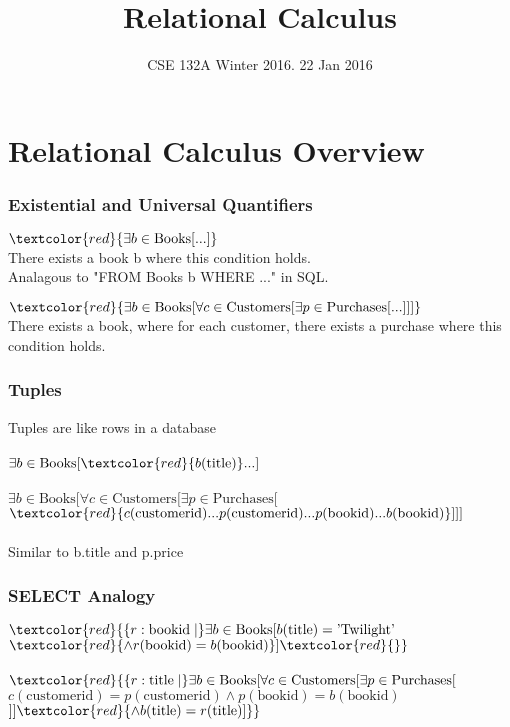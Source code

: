 \documentclass{beamer}
\begin{document}

\title{Relational Calculus}

\date[WI 2016]{CSE 132A Winter 2016. 22 Jan 2016}

\subject{Relational Calculus} %

\begin{frame}
  \titlepage
\end{frame}

\section{Relational Calculus Overview}
\begin{frame}
  \frametitle{Existential and Universal Quantifiers}
  $\textcolor{red}{\exists b \in \text{Books} [...]}$\\
  There exists a book b where this condition holds.\\
  Analagous to "FROM Books b WHERE ..." in SQL.
  
  \hfill 
  
  $\textcolor{red}{\exists b \in \text{Books} [\forall c \in \text{Customers} [ \exists p \in \text{Purchases} [...] ] ]}$\\
  There exists a book, where for each customer, there exists a purchase where this condition holds.\\
  \hfill 
\end{frame}

\begin{frame}
  \frametitle{Tuples}
  Tuples are like rows in a database\\
  \hfill \\
  $\exists b \in \text{Books} [\textcolor{red}{b(\text{title})} ...]$\\
  \hfill \\
  $\exists b \in \text{Books} [\forall c \in \text{Customers} [ \exists p \in \text{Purchases} [ $
  $\textcolor{red}{c(\text{customerid}) ... p(\text{customerid}) ... p(\text{bookid}) ... b(\text{bookid})}] ] ]$\\
  \hfill \\
  Similar to b.title and p.price
\end{frame}

\begin{frame}
  \frametitle{SELECT Analogy}
  $\textcolor{red}{\{r:\text{bookid} \mid }\exists b \in \text{Books} [b(\text{title})
= \text{'Twilight'}$ \\
  $\textcolor{red}{\land r(\text{bookid}) = b(\text{bookid})}]\textcolor{red}{\}}$\\
  \hfill \\
  $\textcolor{red}{\{ r:\text{title} \mid }\exists b \in \text{Books} [\forall c \in
\text{Customers} [ \exists p \in \text{Purchases} [ $\\
  $c(\text{customerid}) = p(\text{customerid}) \land  p(\text{bookid}) = b(\text{bookid})$
\\
  $] ] \textcolor{red}{ \land b(\text{title}) = r(\text{title})]\}}$
\end{frame}
\end{document}
